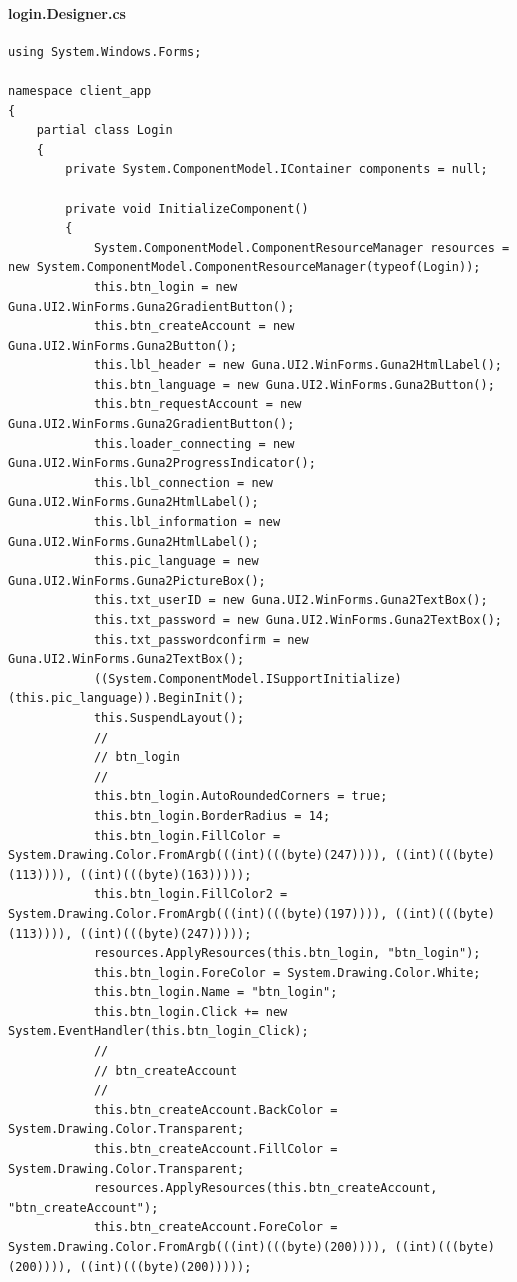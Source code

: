 \documentclass{article}
\begin{document}
\paragraph{login.Designer.cs}\label{client/login.designer.cs}
\begin{verbatim}
using System.Windows.Forms;

namespace client_app
{
    partial class Login
    {
        private System.ComponentModel.IContainer components = null;

        private void InitializeComponent()
        {
			System.ComponentModel.ComponentResourceManager resources = new System.ComponentModel.ComponentResourceManager(typeof(Login));
			this.btn_login = new Guna.UI2.WinForms.Guna2GradientButton();
			this.btn_createAccount = new Guna.UI2.WinForms.Guna2Button();
			this.lbl_header = new Guna.UI2.WinForms.Guna2HtmlLabel();
			this.btn_language = new Guna.UI2.WinForms.Guna2Button();
			this.btn_requestAccount = new Guna.UI2.WinForms.Guna2GradientButton();
			this.loader_connecting = new Guna.UI2.WinForms.Guna2ProgressIndicator();
			this.lbl_connection = new Guna.UI2.WinForms.Guna2HtmlLabel();
			this.lbl_information = new Guna.UI2.WinForms.Guna2HtmlLabel();
			this.pic_language = new Guna.UI2.WinForms.Guna2PictureBox();
			this.txt_userID = new Guna.UI2.WinForms.Guna2TextBox();
			this.txt_password = new Guna.UI2.WinForms.Guna2TextBox();
			this.txt_passwordconfirm = new Guna.UI2.WinForms.Guna2TextBox();
			((System.ComponentModel.ISupportInitialize)(this.pic_language)).BeginInit();
			this.SuspendLayout();
			// 
			// btn_login
			// 
			this.btn_login.AutoRoundedCorners = true;
			this.btn_login.BorderRadius = 14;
			this.btn_login.FillColor = System.Drawing.Color.FromArgb(((int)(((byte)(247)))), ((int)(((byte)(113)))), ((int)(((byte)(163)))));
			this.btn_login.FillColor2 = System.Drawing.Color.FromArgb(((int)(((byte)(197)))), ((int)(((byte)(113)))), ((int)(((byte)(247)))));
			resources.ApplyResources(this.btn_login, "btn_login");
			this.btn_login.ForeColor = System.Drawing.Color.White;
			this.btn_login.Name = "btn_login";
			this.btn_login.Click += new System.EventHandler(this.btn_login_Click);
			// 
			// btn_createAccount
			// 
			this.btn_createAccount.BackColor = System.Drawing.Color.Transparent;
			this.btn_createAccount.FillColor = System.Drawing.Color.Transparent;
			resources.ApplyResources(this.btn_createAccount, "btn_createAccount");
			this.btn_createAccount.ForeColor = System.Drawing.Color.FromArgb(((int)(((byte)(200)))), ((int)(((byte)(200)))), ((int)(((byte)(200)))));

\end{verbatim}
\end{document}
